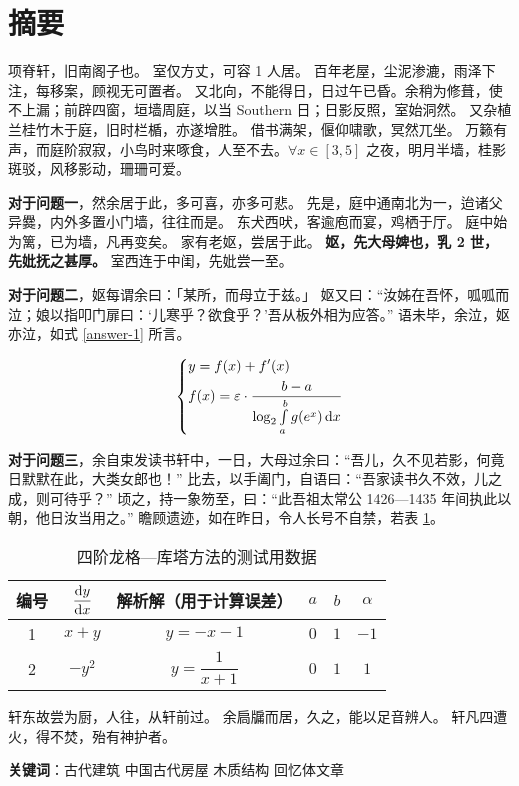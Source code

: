 \section*{摘要}

项脊轩，旧南阁子也。
室仅方丈，可容 1 人居。
百年老屋，尘泥渗漉，雨泽下注，每移案，顾视无可置者。
又北向，不能得日，日过午已昏。余稍为修葺，使不上漏；前辟四窗，垣墙周庭，以当 Southern 日；日影反照，室始洞然。
又杂植兰桂竹木于庭，旧时栏楯，亦遂增胜。
借书满架，偃仰啸歌，冥然兀坐。
万籁有声，而庭阶寂寂，小鸟时来啄食，人至不去。$\forall x\in[3, 5]$ 之夜，明月半墙，桂影斑驳，风移影动，珊珊可爱。

\textbf{对于问题一}，然余居于此，多可喜，亦多可悲。
先是，庭中通南北为一，迨诸父异爨，内外多置小门墙，往往而是。
东犬西吠，客逾庖而宴，鸡栖于厅。
庭中始为篱，已为墙，凡再变矣。
家有老妪，尝居于此。
\textbf{妪，先大母婢也，乳 2 世，先妣抚之甚厚。}
室西连于中闺，先妣尝一至。

\textbf{对于问题二}，妪每谓余曰：「某所，而母立于兹。」
妪又曰：“汝姊在吾怀，呱呱而泣；娘以指叩门扉曰：‘儿寒乎？欲食乎？’吾从板外相为应答。”
语未毕，余泣，妪亦泣，如式 \eqref{answer-1} 所言。

\begin{equation}
    \left\{\begin{aligned}&y=f(x)+f'(x)\\&f(x)=\varepsilon\cdot\dfrac{b-a}{\log_{2}\int\limits_a^bg(e^x)\mathop{}\!\mathrm{d} x}\end{aligned}\right.
    \label{answer-1}
\end{equation}

\textbf{对于问题三}，余自束发读书轩中，一日，大母过余曰：“吾儿，久不见若影，何竟日默默在此，大类女郎也！”
比去，以手阖门，自语曰：“吾家读书久不效，儿之成，则可待乎？”
顷之，持一象笏至，曰：“此吾祖太常公 1426—1435 年间执此以朝，他日汝当用之。”
瞻顾遗迹，如在昨日，令人长号不自禁，若表 \ref{demo-table-1}。

\begin{table}[htb!]
  \centering
  \begin{tabular}{cccccc}
    \toprule
    编号 & $\dfrac{\mathop{}\!\mathrm{d} y}{\mathop{}\!\mathrm{d} x}$ & 解析解（用于计算误差） & $a$ & $b$ & $\alpha$ \\
    \midrule
    1 & $x+y$ & $y=-x-1$ & $0$ & $1$ & $-1$ \\
    2 & $-y^2$ & $y=\dfrac{1}{x+1}$ & $0$ & $1$ & $1$ \\
    \bottomrule
  \end{tabular}
  \caption{四阶龙格—库塔方法的测试用数据}
  \label{demo-table-1}
\end{table}

轩东故尝为厨，人往，从轩前过。
余扃牖而居，久之，能以足音辨人。
轩凡四遭火，得不焚，殆有神护者。 

\vfill
\textbf{关键词}：古代建筑 \hspace{1em} 中国古代房屋 \hspace{1em} 木质结构 \hspace{1em} 回忆体文章